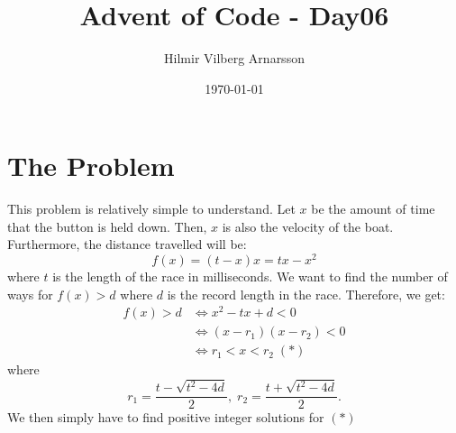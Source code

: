 \documentclass{article}
\begin{document}
\title{Advent of Code - Day06}
\author{Hilmir Vilberg Arnarsson}
\date{\today}

\maketitle
\clearpage
\setlength{\parskip}{1em}


\section*{The Problem}
This problem is relatively simple to understand. Let $x$ be the amount of time that the button is held down.
Then, $x$ is also the velocity of the boat. Furthermore, the distance travelled will be:
$$f(x) = (t-x)x = tx -x^2$$
where $t$ is the length of the race in milliseconds. We want to find the number of ways
for $f(x) > d$ where $d$ is the record length in the race. Therefore, we get:
\begin{align*}
    f(x) > d &\Longleftrightarrow x^2 - tx + d < 0\\
    &\Longleftrightarrow (x-r_1)(x-r_2) < 0 \\
    &\Longleftrightarrow r_1 < x < r_2\; (*)
\end{align*}
where 
$$
r_1 = \frac{t - \sqrt{t^2-4d}}{2},\; r_2 = \frac{t + \sqrt{t^2-4d}}{2}.
$$
We then simply have to find positive integer solutions for $(*)$
\end{document}

